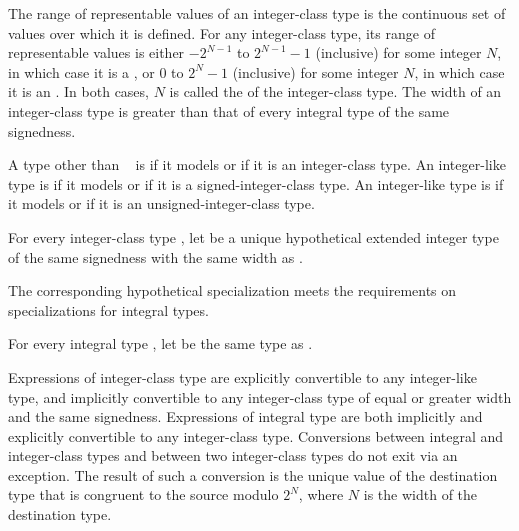 \pnum
The range of representable values of an integer-class type
is the continuous set of values over which it is defined.
For any integer-class type,
its range of representable values is
either $-2^{N-1}$ to $2^{N-1}-1$ (inclusive) for some integer $N$,
in which case it is a , or
$0$ to $2^{N}-1$ (inclusive) for some integer $N$,
in which case it is an .
In both cases, $N$ is called
the  of the integer-class type.
The width of an integer-class type is greater than
that of every integral type of the same signedness.

\pnum
A type  other than \cv{}~ is 
if it models  or
if it is an integer-class type.
An integer-like type  is 
if it models  or
if it is a signed-integer-class type.
An integer-like type  is 
if it models  or
if it is an unsigned-integer-class type.

\pnum
For every integer-class type ,
let  be a unique hypothetical extended integer type
of the same signedness with the same width as .
\begin{note}
The corresponding hypothetical specialization 
meets the requirements on  specializations
for integral types.
\end{note}
For every integral type , let  be the same type as .

\pnum
Expressions of integer-class type are
explicitly convertible to any integer-like type, and
implicitly convertible to any integer-class type
of equal or greater width and the same signedness.
Expressions of integral type are
both implicitly and explicitly convertible to any integer-class type.
Conversions between integral and integer-class types
and between two integer-class types do not exit via an exception.
The result of such a conversion is the unique value of the destination type
that is congruent to the source modulo $2^N$,
where $N$ is the width of the destination type.

